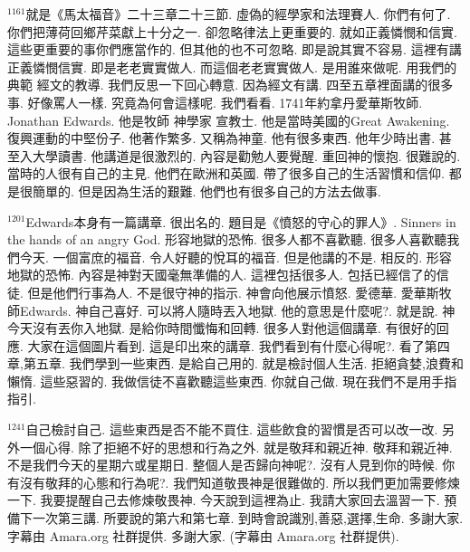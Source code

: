\documentclass{book}
\begin{document}
$^{1161}$就是《馬太福音》二十三章二十三節.
虛偽的經學家和法理賽人.
你們有何了.
你們把薄荷回鄉芹菜獻上十分之一.
卻忽略律法上更重要的.
就如正義憐憫和信實.
這些更重要的事你們應當作的.
但其他的也不可忽略.
即是說其實不容易.
這裡有講正義憐憫信實.
即是老老實實做人.
而這個老老實實做人.
是用誰來做呢.
用我們的典範 經文的教導.
我們反思一下回心轉意.
因為經文有講.
四至五章裡面講的很多事.
好像罵人一樣.
究竟為何會這樣呢.
我們看看.
1741年約拿丹愛華斯牧師.
Jonathan Edwards.
他是牧師 神學家 宣教士.
他是當時美國的Great Awakening.
復興運動的中堅份子.
他著作繁多.
又稱為神童.
他有很多東西.
他年少時出書.
甚至入大學讀書.
他講道是很激烈的.
內容是勸勉人要覺醒.
重回神的懷抱.
很難說的.
當時的人很有自己的主見.
他們在歐洲和英國.
帶了很多自己的生活習慣和信仰.
都是很簡單的.
但是因為生活的艱難.
他們也有很多自己的方法去做事.

$^{1201}$Edwards本身有一篇講章.
很出名的.
題目是《憤怒的守心的罪人》.
Sinners in the hands of an angry God.
形容地獄的恐怖.
很多人都不喜歡聽.
很多人喜歡聽我們今天.
一個富庶的福音.
令人好聽的悅耳的福音.
但是他講的不是.
相反的.
形容地獄的恐怖.
內容是神對天國毫無準備的人.
這裡包括很多人.
包括已經信了的信徒.
但是他們行事為人.
不是很守神的指示.
神會向他展示憤怒.
愛德華.
愛華斯牧師Edwards.
神自己喜好.
可以將人隨時丟入地獄.
他的意思是什麼呢?.
就是說.
神今天沒有丟你入地獄.
是給你時間懺悔和回轉.
很多人對他這個講章.
有很好的回應.
大家在這個圖片看到.
這是印出來的講章.
我們看到有什麼心得呢?.
看了第四章,第五章.
我們學到一些東西.
是給自己用的.
就是檢討個人生活.
拒絕貪婪,浪費和懶惰.
這些惡習的.
我做信徒不喜歡聽這些東西.
你就自己做.
現在我們不是用手指指引.

$^{1241}$自己檢討自己.
這些東西是否不能不買住.
這些飲食的習慣是否可以改一改.
另外一個心得.
除了拒絕不好的思想和行為之外.
就是敬拜和親近神.
敬拜和親近神.
不是我們今天的星期六或星期日.
整個人是否歸向神呢?.
沒有人見到你的時候.
你有沒有敬拜的心態和行為呢?.
我們知道敬畏神是很難做的.
所以我們更加需要修煉一下.
我要提醒自己去修煉敬畏神.
今天說到這裡為止.
我請大家回去溫習一下.
預備下一次第三講.
所要說的第六和第七章.
到時會說識別,善惡,選擇,生命.
多謝大家.
字幕由 Amara.org 社群提供.
多謝大家.
(字幕由 Amara.org 社群提供).
\newpage
\end{document}
